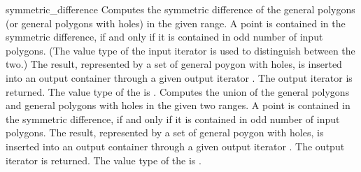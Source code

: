\begin{ccRefFunction}{symmetric_difference}
{Computes the symmetric difference of the general polygons (or general 
polygons with holes) in the given range. A point is contained in the 
symmetric difference, if and only if it is contained in odd number of 
input polygons. (The value type of the input iterator is used to 
distinguish between the two.) The result, represented by a set
of general poygon with holes, is inserted into an output container
through a given output iterator . The output iterator is
returned. The value type of the  is
.}
\ccGlue
{}
{Computes the union of the general polygons and general polygons
with holes in the given two ranges. A point is contained in the 
symmetric difference, if and only if it is contained in odd number of 
input polygons. The result, represented by a set of general poygon with 
holes, is inserted into an output container through a given output 
iterator . The output iterator is returned. The value type of 
the  is .}

\ccSeeAlso
{}\\
\\
\\

\end{ccRefFunction}

\ccRefPageEnd
